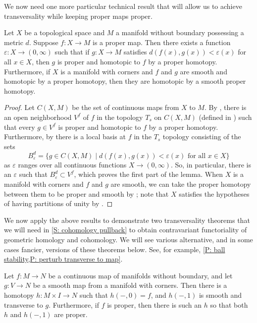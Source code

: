 We now need one more particular technical result that will allow us to achieve transversality while keeping proper maps proper. 

\begin{lemma}\label{L: nearby proper homotopy}
	Let $X$ be a topological space and $M$ a manifold without boundary possessing a metric $d$.
	Suppose $f \colon X \to M$ is a proper map.
	Then there exists a function $\varepsilon \colon X \to (0,\infty)$ such that if $g \colon X \to M$ satisfies $d(f(x),g(x)) < \varepsilon(x)$ for all $x \in X$, then $g$ is proper and homotopic to $f$ by a proper homotopy.
	Furthermore, if $X$ is a manifold with corners and $f$ and $g$ are smooth and homotopic by a proper homotopy, then they are homotopic by a smooth proper homotopy.
\end{lemma}
\begin{proof}
	Let $C(X,M)$ be the set of continuous maps from $X$ to $M$. 
	By \cite[Proposition 9.2.28]{MaDo92}, there is an open neighborhood $V^f$ of $f$ in the topology $T_s$ on $C(X,M)$ (defined in \cite[Proposition 9.2.1]{MaDo92}) such that every $g \in V^f$ is proper and homotopic to $f$ by a proper homotopy. 
	Furthermore, by \cite[Proposition 9.3.9]{MaDo92} there is a local basis at $f$ in the $T_s$ topology consisting of the sets
	$$B_\varepsilon^d = \{g \in C(X,M) \mid d(f(x),g(x)) < \varepsilon (x) \text{ for all } x \in X\}$$
	as $\varepsilon$ ranges over all continuous functions $X \to (0,\infty)$. 
	So, in particular, there is an $\varepsilon$ such that $B_\varepsilon^d \subset V^f$, which proves the first part of the lemma. 
	When $X$ is a manifold with corners and $f$ and $g$ are smooth, we can take the proper homotopy between them to be proper and smooth by \cite[Proposition 9.2.35]{MaDo92}; note that $X$ satisfies the hypotheses of having partitions of unity by \cite[Corollary 1.5.14]{MaDo92}.
\end{proof}


We now apply the above results to demonstrate two transversality theorems that we will need in \cref{S: cohomology pullback} to obtain contravariant functoriality of geometric homology and cohomology. 
We will see various alternative, and in some cases fancier, versions of these theorems below.
See, for example, \cref{P: ball stability,P: perturb transverse to map}.

\begin{theorem}\label{T: basic trans}
	Let $f \colon M \to N$ be a continuous map of manifolds without boundary, and let $g \colon V \to N$ be a smooth map from a manifold with corners.
	Then there is a homotopy $h \colon M \times I \to N$ such that $h(-,0) = f$, and $h(-,1)$ is smooth and transverse to $g$.
	Furthermore, if $f$ is proper, then there is such an $h$ so that both $h$ and $h(-,1)$ are proper. 
\end{theorem}

